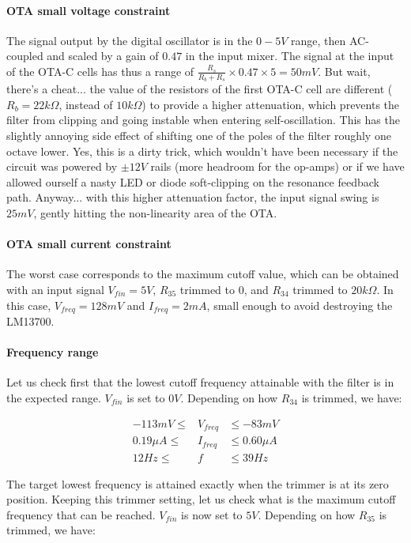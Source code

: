 \documentclass[a4paper,11pt]{article}
\begin{document}
\paragraph{OTA small voltage constraint} The signal output by the digital oscillator is in the $0-5V$ range, then AC-coupled and scaled by a gain of $0.47$ in the input mixer. The signal at the input of the OTA-C cells has thus a range of $\frac{R_s}{R_b + R_s} \times 0.47 \times 5 = 50mV$. But wait, there's a cheat... the value of the resistors of the first OTA-C cell are different ($R_b = 22k\Omega$, instead of $10k\Omega$) to provide a higher attenuation, which prevents the filter from clipping and going instable when entering self-oscillation. This has the slightly annoying side effect of shifting one of the poles of the filter roughly one octave lower. Yes, this is a dirty trick, which wouldn't have been necessary if the circuit was powered by $\pm 12V$ rails (more headroom for the op-amps) or if we have allowed ourself a nasty LED or diode soft-clipping on the resonance feedback path. Anyway... with this higher attenuation factor, the input signal swing is $25mV$, gently hitting the non-linearity area of the OTA.

\paragraph{OTA small current constraint} The worst case corresponds to the maximum cutoff value, which can be obtained with an input signal $V_{fin} = 5V$, $R_{35}$ trimmed to 0, and $R_{34}$ trimmed to $20k\Omega$. In this case, $V_{freq} = 128mV$ and $I_{freq} = 2mA$, small enough to avoid destroying the LM13700.

\paragraph{Frequency range} Let us check first that the lowest cutoff frequency attainable with the filter is in the expected range. $V_{fin}$ is set to $0V$. Depending on how $R_{34}$ is trimmed, we have:

\begin{eqnarray}
-113mV \leq &V_{freq}& \leq -83mV \\
0.19\mu A \leq &I_{freq}& \leq 0.60\mu A \\
12Hz \leq &f& \leq 39Hz
\end{eqnarray}

The target lowest frequency is attained exactly when the trimmer is at its zero position. Keeping this trimmer setting, let us check what is the maximum cutoff frequency that can be reached. $V_{fin}$ is now set to $5V$. Depending on how $R_{35}$ is trimmed, we have:
\end{document}
